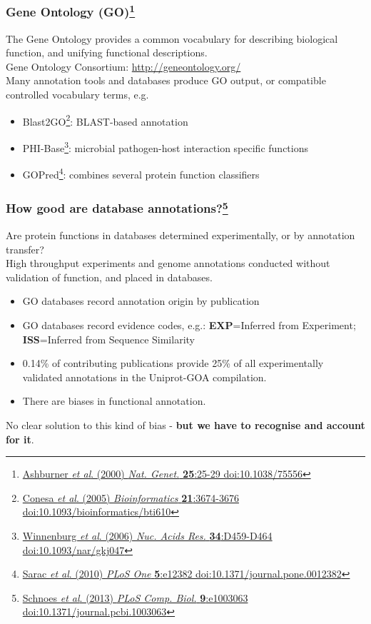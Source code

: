 \begin{frame}
  \frametitle{Gene Ontology (GO)\footnote{\tiny{\href{http://dx.doi.org/10.1038/75556}{Ashburner \textit{et al}. (2000) \textit{Nat. Genet.} \textbf{25}:25-29 doi:10.1038/75556}}}}
  The Gene Ontology provides a common vocabulary for describing biological function, and unifying functional descriptions.\\[0.1cm]
  Gene Ontology Consortium: \href{http://geneontology.org/}{http://geneontology.org/} \\[0.1cm]
  Many annotation tools and databases produce GO output, or compatible controlled vocabulary terms, e.g.
  \begin{itemize}
    \item Blast2GO\footnote{\tiny{\href{http://dx.doi.org/10.1093/bioinformatics/bti610}{Conesa \textit{et al}. (2005) \textit{Bioinformatics} \textbf{21}:3674-3676 doi:10.1093/bioinformatics/bti610}}}: BLAST-based annotation
    \item PHI-Base\footnote{\tiny{\href{http://dx.doi.org/10.1093/nar/gkj047}{Winnenburg \textit{et al}. (2006) \textit{Nuc. Acids Res.} \textbf{34}:D459-D464 doi:10.1093/nar/gkj047}}}: microbial pathogen-host interaction specific functions
    \item GOPred\footnote{\tiny{\href{http://dx.doi.org/10.1371/journal.pone.0012382}{Sarac \textit{et al}. (2010) \textit{PLoS One} \textbf{5}:e12382 doi:10.1371/journal.pone.0012382}}}: combines several protein function classifiers
  \end{itemize}
\end{frame}

\begin{frame}
  \frametitle{How good are database annotations?\footnote{\tiny{\href{http://dx.doi.org/10.1371/journal.pcbi.1003063}{Schnoes \textit{et al}. (2013) \textit{PLoS Comp. Biol.} \textbf{9}:e1003063 doi:10.1371/journal.pcbi.1003063}}}}
  Are protein functions in databases determined experimentally, or by annotation transfer?\\[0.1cm]
  High throughput experiments and genome annotations conducted without validation of function, and placed in databases.\\[0.1cm]
  \begin{itemize}
    \item GO databases record annotation origin by publication 
    \item GO databases record evidence codes, e.g.: \textbf{EXP}=Inferred from Experiment; \textbf{ISS}=Inferred from Sequence Similarity
    \item 0.14\% of contributing publications provide 25\% of all experimentally validated annotations in the Uniprot-GOA compilation.
    \item There are biases in functional annotation.
  \end{itemize}
  No clear solution to this kind of bias - \textbf{but we have to recognise and account for it}.
\end{frame}

